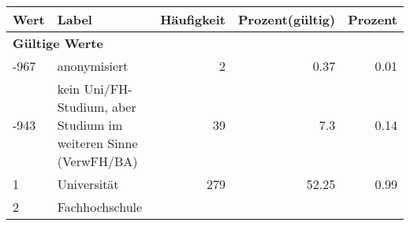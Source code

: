      \begin{longtable}{lXrrr}
     \toprule
     \textbf{Wert} & \textbf{Label} & \textbf{Häufigkeit} & \textbf{Prozent(gültig)} & \textbf{Prozent} \\
     \endhead
     \midrule
     \multicolumn{5}{l}{\textbf{Gültige Werte}}\\

     -967 &
     \multicolumn{1}{X}{ anonymisiert   } &


       \num{2} &
       \num[round-mode=places,round-precision=2]{0.37} &
         \num[round-mode=places,round-precision=2]{0.01} \\

     -943 &
     \multicolumn{1}{X}{ kein Uni/FH-Studium, aber Studium im weiteren Sinne (VerwFH/BA)   } &


       \num{39} &
       \num[round-mode=places,round-precision=2]{7.3} &
         \num[round-mode=places,round-precision=2]{0.14} \\

     1 &
     \multicolumn{1}{X}{ Universität   } &


       \num{279} &
       \num[round-mode=places,round-precision=2]{52.25} &
         \num[round-mode=places,round-precision=2]{0.99} \\

     2 &
     \multicolumn{1}{X}{ Fachhochschule   } &



\end{longtable}
